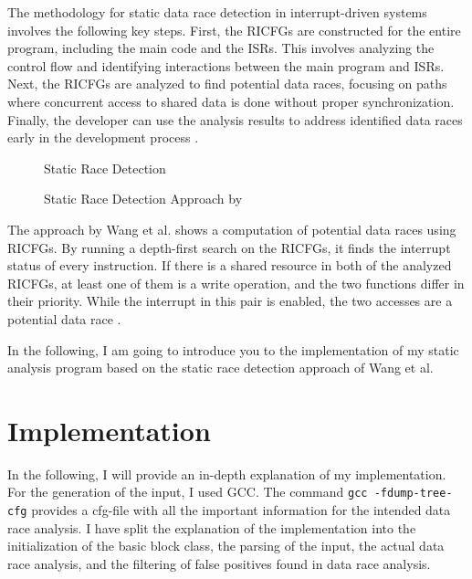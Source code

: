 \documentclass[
fancyheadings, %
%
%
]{stsreprt}
\begin{document}
{		The methodology for static data race detection in interrupt-driven systems involves the following key steps. First, the \acp{RICFG} are constructed for the entire program, including the main code and the \acp{ISR}. This involves analyzing the control flow and identifying interactions between the main program and \acp{ISR}. Next, the \acp{RICFG} are analyzed to find potential data races, focusing on paths where concurrent access to shared data is done without proper synchronization. Finally, the developer can use the analysis results to address identified data races early in the development process \cite{wang2020}.
		
		
		\begin{figure}[H]
			\begin{algorithm}[H]
				\caption{Static Race Detection}
				
				\BlankLine
			\end{algorithm}
			\caption{Static Race Detection Approach by \cite{wang2020}}
		\end{figure}
		
		The approach by Wang et al. shows a computation of potential data races using \acp{RICFG}. By running a depth-first search on the \acp{RICFG}, it finds the interrupt status of every instruction. If there is a shared resource in both of the analyzed \acp{RICFG}, at least one of them is a write operation, and the two functions differ in their priority. While the interrupt in this pair is enabled, the two accesses are a potential data race \cite{wang2020}.
		
		In the following, I am going to introduce you to the implementation of my static analysis program based on the static race detection approach of Wang et al.
		
		
		
		\chapter{Implementation}
		In the following, I will provide an in-depth explanation of my implementation. For the generation of the input, I used \ac{GCC}. The command \texttt{gcc -fdump-tree-cfg} provides a cfg-file with all the important information for the intended data race analysis. I have split the explanation of the implementation into the initialization of the basic block class, the parsing of the input, the actual data race analysis, and the filtering of false positives found in data race analysis.
		
}
\end{document}
